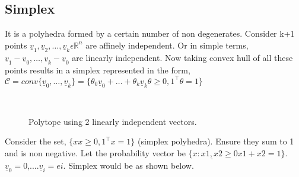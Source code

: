 \documentclass{tufte-handout}
\theoremstyle{remark}
\renewcommand{\vec}[1]{\underline{#1}}
\begin{document}
\subsection{Simplex}
It is a polyhedra formed by a certain number of non degenerates.\cite{boyd2004convex} Consider k+1 points $\vec{v}_1, \vec{v}_2, \ldots, \vec{v}_k \epsilon \mathbb{R}^n $ are affinely independent. Or in simple terms,
$\vec{v}_1-\vec{v}_0, \ldots, \vec{v}_k-\vec{v}_0$ are linearly independent. Now taking convex hull of all these points results in a simplex represented in the form, $\mathcal{C}=conv\{\vec{v}_0, \ldots, \vec{v}_k\}=\{\theta_0\vec{v}_0+\ldots+\theta_k\vec{v}_k\theta \ge 0, 1^\top\theta=1\}$

\\
\begin{figure}
    \centering


\caption{Polytope using 2 linearly independent vectors.}
\end{figure}
Consider the set, $\{xx \ge 0, 1^\top x=1 \}$ (simplex polyhedra). Ensure they sum to 1 and is non negative.
Let the probability vector be $\{x:\vec{x1,x2} \ge 0 x1+x2=1 \}$. $\vec{v}_0=0$,....$\vec{v}_i=ei$. Simplex would be as shown below.
\end{document}
